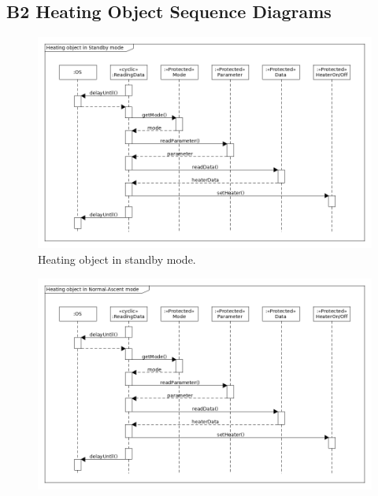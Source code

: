 \begin{landscape}
\subsection*{B2 Heating Object Sequence Diagrams}
\begin{figure}[H]
    \centering
    \includegraphics[height=0.9\textwidth]{appendix/img/heater-seq-dia-a.png}
    \caption{Heating object in standby mode.}
    \label{heatera}
\end{figure}
\begin{figure}[H]
    \centering
    \includegraphics[height=0.9\textwidth]{appendix/img/heater-seq-dia-b.png}

\end{figure}
\end{landscape}
